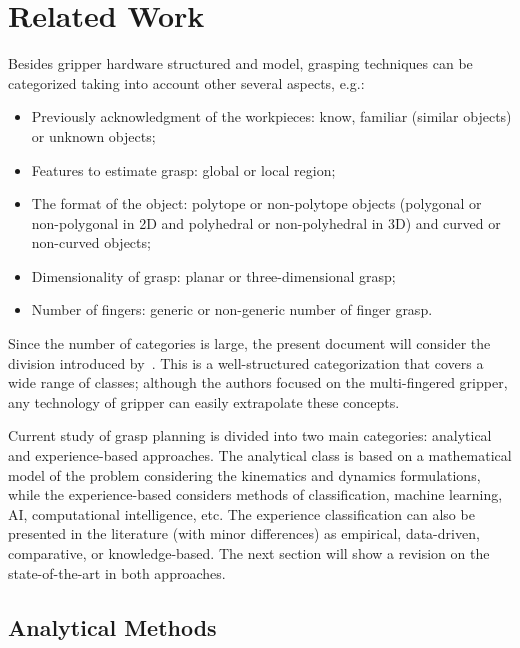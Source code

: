 \chapter{Related Work}
\label{Ch:EstadoDaArte}

 Besides gripper hardware structured and model, grasping techniques can be categorized taking into account other several aspects, e.g.:

\begin{itemize}
\item Previously acknowledgment of the workpieces: know, familiar (similar objects) or unknown objects;
\item Features to estimate grasp: global or local region;
\item The format of the object: polytope or non-polytope objects (polygonal or non-polygonal in 2D and polyhedral or non-polyhedral in 3D) and curved or non-curved objects;
\item Dimensionality of grasp: planar or three-dimensional grasp;
\item Number of fingers: generic or non-generic number of finger grasp.
\end{itemize}

Since the number of categories is large, the present document will consider the division introduced by~\cite{sahbani2012overview}. This is a well-structured categorization that covers a wide range of classes; although the authors focused on the multi-fingered gripper, any technology of gripper can easily extrapolate these concepts.

Current study of grasp planning is divided into two main categories: analytical and experience-based approaches. The analytical class is based on a mathematical model of the problem considering the kinematics and dynamics formulations, while the experience-based considers methods of classification, machine learning, AI, computational intelligence, etc. The experience classification can also be presented in the literature (with minor differences) as empirical, data-driven, comparative, or knowledge-based. The next section will show a revision on the state-of-the-art in both approaches.

\section{Analytical Methods}
\label{sec:soa_analytical_methods}

